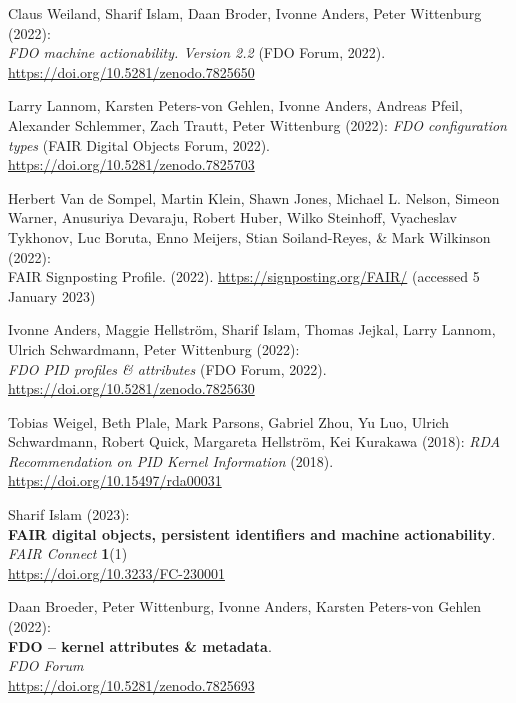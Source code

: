 \begin{thebibliography}{9}
Claus Weiland, Sharif Islam, Daan Broder, Ivonne Anders, Peter
Wittenburg (2022): \\
\emph{{FDO} machine actionability. Version 2.2} ({FDO
Forum}, 2022).
\url{https://doi.org/10.5281/zenodo.7825650}

Larry Lannom, Karsten Peters-von Gehlen, Ivonne Anders, Andreas Pfeil,
Alexander Schlemmer, Zach Trautt, Peter Wittenburg (2022):
\emph{{FDO} configuration types} ({FAIR Digital Objects Forum}, 2022).
\url{https://doi.org/10.5281/zenodo.7825703}

Herbert Van de Sompel, Martin Klein, Shawn Jones, Michael L. Nelson,
Simeon Warner, Anusuriya Devaraju, Robert Huber, Wilko Steinhoff,
Vyacheslav Tykhonov, Luc Boruta, Enno Meijers, Stian Soiland-Reyes, \&
Mark Wilkinson (2022): \\
{FAIR Signposting Profile}. (2022).
\url{https://signposting.org/FAIR/} (accessed 5 January 2023)

Ivonne Anders, Maggie Hellström, Sharif Islam, Thomas Jejkal, Larry
Lannom, Ulrich Schwardmann, Peter Wittenburg (2022): \\
\emph{{FDO PID}
profiles \& attributes} ({FDO Forum}, 2022).
\url{https://doi.org/10.5281/zenodo.7825630}

Tobias Weigel, Beth Plale, Mark Parsons, Gabriel Zhou, Yu Luo, Ulrich
Schwardmann, Robert Quick, Margareta Hellström, Kei Kurakawa (2018):
\emph{{RDA Recommendation} on {PID Kernel Information}} (2018).
\url{https://doi.org/10.15497/rda00031}

Sharif Islam (2023): \\
\textbf{FAIR digital objects, persistent identifiers and machine actionability}. \\
\emph{FAIR Connect} \textbf{1}(1) \\
\url{https://doi.org/10.3233/FC-230001}

Daan Broeder, Peter Wittenburg, Ivonne Anders, Karsten Peters-von
Gehlen (2022): \\
\textbf{FDO -- kernel attributes \& metadata}.\\ 
\emph{FDO Forum}\\
\url{https://doi.org/10.5281/zenodo.7825693}


\end{thebibliography}
